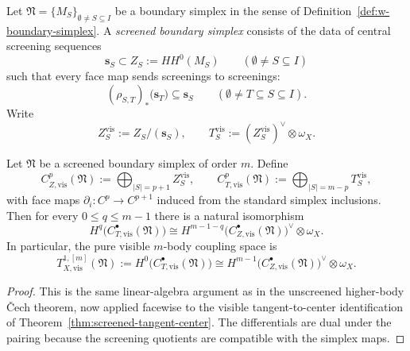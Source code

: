 \begin{definition}
\label{def:screened-boundary-simplex}
Let $\mathfrak N=\{M_S\}_{\emptyset\neq S\subseteq I}$ be a boundary simplex in the sense of
Definition~\ref{def:w-boundary-simplex}.
A \emph{screened boundary simplex} consists of the data of central screening sequences
\[
\mathbf s_S\subset Z_S:=HH^0(M_S)
\qquad (\emptyset\neq S\subseteq I)
\]
such that every face map sends screenings to screenings:
\[
(\rho_{S,T})_*\bigl(\mathbf s_T\bigr)\subseteq \mathbf s_S
\qquad (\emptyset\neq T\subseteq S\subseteq I).
\]
Write
\[
Z_S^{\mathrm{vis}}:=Z_S/(\mathbf s_S),
\qquad
T_S^{\mathrm{vis}}:=(Z_S^{\mathrm{vis}})^{\vee}\otimes \omega_X.
\]
\end{definition}

\begin{theorem}
\label{thm:screened-cech-duality}
Let $\mathfrak N$ be a screened boundary simplex of order $m$.
Define
\[
C_{Z,\mathrm{vis}}^p(\mathfrak N):=\bigoplus_{|S|=p+1} Z_S^{\mathrm{vis}},
\qquad
C_{T,\mathrm{vis}}^p(\mathfrak N):=\bigoplus_{|S|=m-p} T_S^{\mathrm{vis}},
\]
with face maps $\partial_i\colon C^p \to C^{p+1}$ induced from the standard simplex inclusions.
Then for every $0\le q\le m-1$ there is a natural isomorphism
\[
H^q\bigl(C_{T,\mathrm{vis}}^{\bullet}(\mathfrak N)\bigr)
\cong
H^{m-1-q}\bigl(C_{Z,\mathrm{vis}}^{\bullet}(\mathfrak N)\bigr)^{\vee}\otimes \omega_X.
\]
In particular, the pure visible $m$-body coupling space is
\[
T_{X,\mathrm{vis}}^{1,[m]}(\mathfrak N)
:=H^0\bigl(C_{T,\mathrm{vis}}^{\bullet}(\mathfrak N)\bigr)
\cong
H^{m-1}\bigl(C_{Z,\mathrm{vis}}^{\bullet}(\mathfrak N)\bigr)^{\vee}\otimes \omega_X.
\]
\end{theorem}

\begin{proof}
This is the same linear-algebra argument as in the unscreened higher-body \v{C}ech theorem, now applied
facewise to the visible tangent-to-center identification of Theorem~\ref{thm:screened-tangent-center}.
The differentials are dual under the pairing because the screening quotients are compatible with the simplex maps.
\end{proof}

